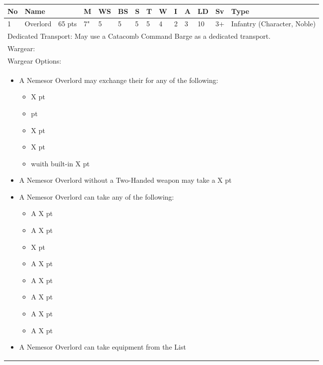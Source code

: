 \noindent
\begin{tabular}{||m{10pt} m{95pt} m{30pt} m{11pt} m{11pt} m{11pt} m{11pt} m{11pt} m{11pt} m{11pt} m{11pt} m{11pt} m{11pt} m{125pt}||}
	\hline
	No & Name & & M & WS & BS & S & T & W & I & A & LD & Sv & Type \\
	\hline
	1 & Overlord & 65 pts & 7" & 5 & 5 & 5 & 5 & 4 & 2 & 3 & 10 & 3+ & Infantry (Character, Noble)\\
	\hline
	\hline	
	\multicolumn{14}{||Z{532 pt}||}{Dedicated Transport: May use a Catacomb Command Barge as a dedicated transport.}\\	
	\hline
	\hline
	\multicolumn{14}{||Z{532 pt}||}{Wargear: \quickref{Staff of Light}}\\
	\multicolumn{14}{||Z{532 pt}||}{Wargear Options:} \\	
	\multicolumn{14}{||Z{532 pt}||}{\begin{itemize}
			\item A Nemesor Overlord may exchange their \quickref{Staff of Light} for any of the following:
			\begin{itemize}
				\item \quickref{Hyperphase Sword} \hrulefill X pt
				\item \quickref{Voidblade} \hrulefill 0 pt
				\item \quickref{Voidscythe} \hrulefill X pt
				\item \quickref{Warscythe} \hrulefill X pt
				\item \quickref{Warscythe} wuith built-in \quickref{Relic Gauss Blaster} \hrulefill X pt
			\end{itemize}
			\item A Nemesor Overlord without a Two-Handed weapon may take a \quickref{Dispersion Shield} \hrulefill X pt
			\item A Nemesor Overlord can take any of the following:
			\begin{itemize}
				\item A \quickref{Gauntlet of Fire} \hrulefill X pt
				\item A \quickref{Tachyon Arrow} \hrulefill X pt
				\item \quickref{Mindshackle Scarabs} \hrulefill X pt
				\item A \quickref{Phase Shifter} \hrulefill X pt
				\item A \quickref{Phylactery} \hrulefill X pt
				\item A \quickref{Sempiternal Weave} \hrulefill X pt
				\item A \quickref{Resurrection Orb} \hrulefill X pt
				\item A \quickref{Tesseract Labyrinth} \hrulefill X pt
			\end{itemize}
			\item A Nemesor Overlord can take equipment from the \quickref{Artefacts of the Aeons} List
	\end{itemize}} \\	
	
\end{tabular}

